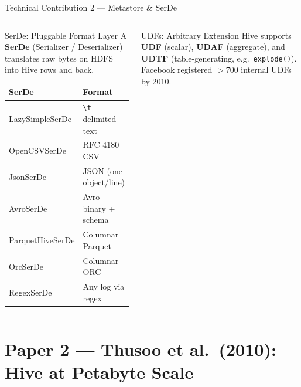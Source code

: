\documentclass[aspectratio=169,10pt]{beamer}
\begin{document}
\begin{frame}{Technical Contribution 2 — Metastore \& SerDe}
\begin{columns}[T]
      \begin{block}{SerDe: Pluggable Format Layer}
        A \textbf{SerDe} (Serializer / Deserializer) translates
        raw bytes on HDFS into Hive rows and back.
        \renewcommand{\arraystretch}{1.2}
        \begin{tabular}{@{}ll@{}}
          \toprule
          \textbf{SerDe} & \textbf{Format} \\
          \midrule
          LazySimpleSerDe & \texttt{\textbackslash{}t}-delimited text \\
          OpenCSVSerDe    & RFC 4180 CSV \\
          JsonSerDe       & JSON (one object/line) \\
          AvroSerDe       & Avro binary + schema \\
          ParquetHiveSerDe& Columnar Parquet \\
          OrcSerDe        & Columnar ORC \\
          RegexSerDe      & Any log via regex \\
          \bottomrule
        \end{tabular}
      \end{block}
      \vspace{4pt}
      \begin{exampleblock}{UDFs: Arbitrary Extension}
        Hive supports \textbf{UDF} (scalar), \textbf{UDAF} (aggregate),
        and \textbf{UDTF} (table-generating, e.g.\ \texttt{explode()}).
        Facebook registered $>$700 internal UDFs by 2010.
      \end{exampleblock}
  \end{columns}
\end{frame}

\section{Paper 2 — Thusoo et al.\ (2010): Hive at Petabyte Scale}
\end{document}
